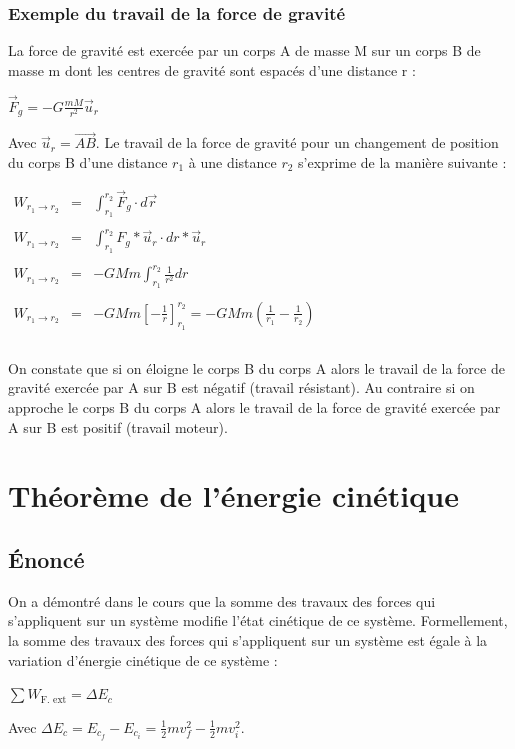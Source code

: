 \documentclass[a4paper,10pt]{book}
\begin{document}
\subsubsection{Exemple du travail de la force de gravité}
La force de gravité est exercée par un corps A de masse M sur un corps B de masse m dont les centres de gravité sont espacés d’une distance r :\\
\begin{center} $\vec{F}_{g}=-G\frac{mM}{r^{2}}\vec{u}_{r}$ \end{center}

Avec $\vec{u}_{r}=\overrightarrow{AB}$. Le travail de la force de gravité pour un changement de position du corps B d’une distance $r_{1}$ à une distance $r_{2}$ s’exprime de la manière suivante :\\

\begin{center} $\begin{array}{rcl}
W_{r_{1}\rightarrow r_{2}}&=& \displaystyle \int_{r_{1}}^{r_{2}}\vec{F}_{g}\cdot d\vec{r}\\\\
W_{r_{1}\rightarrow r_{2}}&=& \displaystyle \int_{r_{1}}^{r_{2}}F_{g}*\vec{u}_{r}\cdot dr*\vec{u}_{r}\\\\
W_{r_{1}\rightarrow r_{2}}&=& -GMm\displaystyle \int_{r_{1}}^{r_{2}}\frac{1}{r^{2}}dr \\\\
W_{r_{1}\rightarrow r_{2}}&=& -GMm\displaystyle \left[ -\frac{1}{r} \right]_{r_{1}}^{r_{2}}=-GMm(\displaystyle \frac{1}{r_{1}}-\frac{1}{r_{2}})\\\\
\end{array}$ \end{center}

On constate que si on éloigne le corps B du corps A alors le travail de la force de gravité exercée par A sur B est négatif (travail résistant). Au contraire si on approche le corps B du corps A alors le travail de la force de gravité exercée par A sur B est positif (travail moteur).

\section{Théorème de l'énergie cinétique}
\subsection{Énoncé}
On a démontré dans le cours que la somme des travaux des forces qui s’appliquent sur un système modifie l’état cinétique de ce système. Formellement, la somme des travaux des forces qui s’appliquent sur un système est égale à la variation d’énergie cinétique de ce système :
\begin{center} $\sum W_{\text{F. ext}}=\Delta E_{c}$ \end{center}
Avec $\Delta E_{c}=E_{c_{f}}-E_{c_{i}}=\frac{1}{2}mv^{2}_{f}-\frac{1}{2}mv^{2}_{i}$.\\
\end{document}
